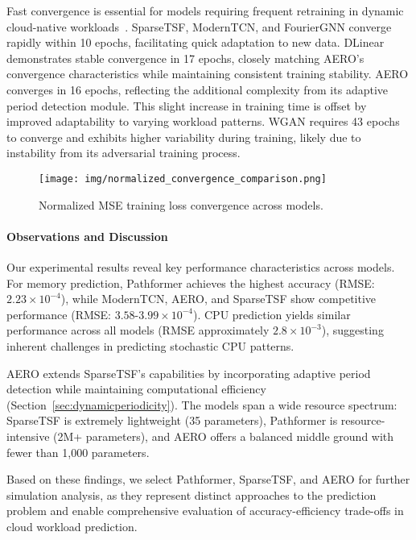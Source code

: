 \documentclass{ieeetmlcn}
\begin{document}
Fast convergence is essential for models requiring frequent retraining in dynamic cloud-native workloads~\cite{gudepu2023adaptive}. SparseTSF, ModernTCN, and FourierGNN converge rapidly within 10 epochs, facilitating quick adaptation to new data. {\color{blue} DLinear demonstrates stable convergence in 17 epochs, closely matching AERO's convergence characteristics while maintaining consistent training stability.} AERO converges in 16 epochs, reflecting the additional complexity from its adaptive period detection module. This slight increase in training time is offset by improved adaptability to varying workload patterns. WGAN requires 43 epochs to converge and exhibits higher variability during training, likely due to instability from its adversarial training process.

\begin{figure}\centering
[t]
\centering
\centering\texttt{[image: img/normalized\_convergence\_comparison.png]}
\caption{Normalized MSE training loss convergence across models.}
\label{fig:normalized_convergence_comparison}
\end{figure}

\paragraph*{Observations and Discussion}

Our experimental results reveal key performance characteristics across models. For memory prediction, Pathformer achieves the highest accuracy (RMSE: $2.23 \times 10^{-4}$), while ModernTCN, AERO, and SparseTSF show competitive performance (RMSE: $3.58$-$3.99 \times 10^{-4}$). CPU prediction yields similar performance across all models (RMSE approximately $2.8 \times 10^{-3}$), suggesting inherent challenges in predicting stochastic CPU patterns.

AERO extends SparseTSF's capabilities by incorporating adaptive period detection while maintaining computational efficiency (Section~\ref{sec:dynamicperiodicity}). The models span a wide resource spectrum: SparseTSF is extremely lightweight (35 parameters), Pathformer is resource-intensive (2M+ parameters), and AERO offers a balanced middle ground with fewer than 1,000 parameters.

Based on these findings, we select Pathformer, SparseTSF, and AERO for further simulation analysis, as they represent distinct approaches to the prediction problem and enable comprehensive evaluation of accuracy-efficiency trade-offs in cloud workload prediction.
\end{document}
